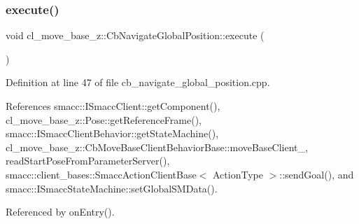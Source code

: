 \subsubsection{\texorpdfstring{execute()}{execute()}}
{\footnotesize\ttfamily void cl\+\_\+move\+\_\+base\+\_\+z\+::\+Cb\+Navigate\+Global\+Position\+::execute (\begin{DoxyParamCaption}{ }\end{DoxyParamCaption})}



Definition at line 47 of file cb\+\_\+navigate\+\_\+global\+\_\+position.\+cpp.



References smacc\+::\+I\+Smacc\+Client\+::get\+Component(), cl\+\_\+move\+\_\+base\+\_\+z\+::\+Pose\+::get\+Reference\+Frame(), smacc\+::\+I\+Smacc\+Client\+Behavior\+::get\+State\+Machine(), cl\+\_\+move\+\_\+base\+\_\+z\+::\+Cb\+Move\+Base\+Client\+Behavior\+Base\+::move\+Base\+Client\+\_\+, read\+Start\+Pose\+From\+Parameter\+Server(), smacc\+::client\+\_\+bases\+::\+Smacc\+Action\+Client\+Base$<$ Action\+Type $>$\+::send\+Goal(), and smacc\+::\+I\+Smacc\+State\+Machine\+::set\+Global\+S\+M\+Data().



Referenced by on\+Entry().


